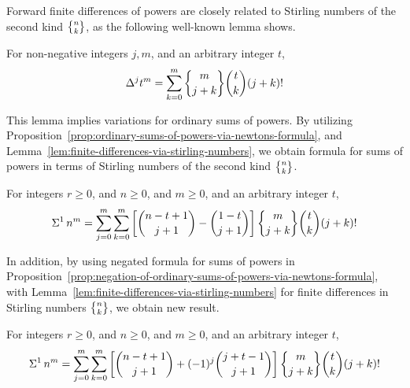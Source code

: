 Forward finite differences of powers are closely related
to Stirling numbers of the second kind $\stirlingii{n}{k}$,
as the following well-known lemma shows.

\begin{lemma}
  \label{lem:finite-differences-via-stirling-numbers}
  For non-negative integers $j,m$, and an arbitrary integer $t$,
  \begin{align*}
    \Delta^{j} t^{m} = \sum_{k=0}^{m} \stirlingii{m}{j+k} \binom{t}{k} (j+k)!
  \end{align*}
\end{lemma}

This lemma
implies variations for ordinary sums of powers.
By utilizing Proposition~\eqref{prop:ordinary-sums-of-powers-via-newtons-formula},
and Lemma~\eqref{lem:finite-differences-via-stirling-numbers}, we obtain
formula for sums of powers
in terms of Stirling numbers of the second kind $\stirlingii{n}{k}$.

\begin{proposition}
  \label{prop:ordinary-sums-of-powers-via-stirling-numbers}
  For integers $r\geq0$, and $n\geq 0$, and $m\geq 0$,
  and an arbitrary integer $t$,
  \begin{align*}
    \KnuthRFoldSum{1}{n}{m}
    = \sum_{j=0}^{m} \sum_{k=0}^{m}
    \left[ \binom{n-t+1}{j+1} - \binom{1-t}{j+1} \right]
    \stirlingii{m}{j+k} \binom{t}{k} (j+k)!
  \end{align*}
\end{proposition}

In addition, by using negated formula for sums of
powers in
Proposition~\eqref{prop:negation-of-ordinary-sums-of-powers-via-newtons-formula},
with Lemma~\eqref{lem:finite-differences-via-stirling-numbers} for
finite differences in Stirling numbers $\stirlingii{n}{k}$,
we obtain new result.

\begin{proposition}
  \label{prop:negated-ordinary-sums-of-powers-via-stirling-numbers}
  For integers $r\geq0$, and $n\geq 0$, and $m\geq 0$,
  and an arbitrary integer $t$,
  \begin{align*}
    \KnuthRFoldSum{1}{n}{m}
    = \sum_{j=0}^{m} \sum_{k=0}^{m}
    \left[ \binom{n-t+1}{j+1} + (-1)^j \binom{j+t-1}{j+1} \right]
    \stirlingii{m}{j+k} \binom{t}{k} (j+k)!
  \end{align*}
\end{proposition}

